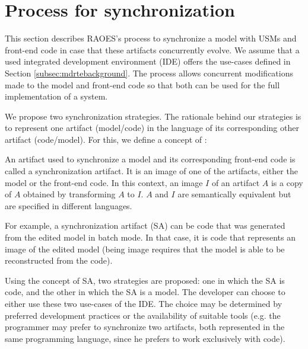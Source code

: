 \section{Process for synchronization}
\label{sec:collaboration}
This section describes RAOES's process to synchronize a model with USMs and front-end code in case that these artifacts concurrently evolve.
We assume that a used integrated development environment (IDE) %
offers the use-cases defined in Section \ref{subsec:mdrtebackground}. 
The process allows concurrent modifications made to the model
and front-end code so that both can be used for the full implementation of a system.


We propose two synchronization strategies.
The rationale behind our strategies
is to represent one artifact (model/code) in the language of its corresponding other artifact (code/model).
For this, we define a
concept of :

\begin{definition}
	An artifact used to synchronize a model and its corresponding front-end code
	is called a synchronization artifact.
	It is an image of one of the artifacts, either the model or the front-end code.
	In this context, an image $I$ of an artifact $A$ is a copy of $A$ obtained by
	transforming $A$ to $I$. $A$ and $I$ are semantically equivalent but are specified in different languages.
\end{definition}

For example, a synchronization artifact (SA) can be code that was generated from the edited model in batch mode.
In that case, it is code that represents an image of the edited model (being image requires that the model is able to be reconstructed from the code).

Using the concept of SA, two strategies are
proposed: one in which the SA is code,
and the other in which the SA is a model.
The developer can choose to either use these two use-cases of the IDE. 
The choice may be determined by
preferred development practices or the availability of suitable tools (e.g. the programmer
may prefer to synchronize two artifacts, both represented
in the same programming language, since he prefers to
work exclusively with code).

